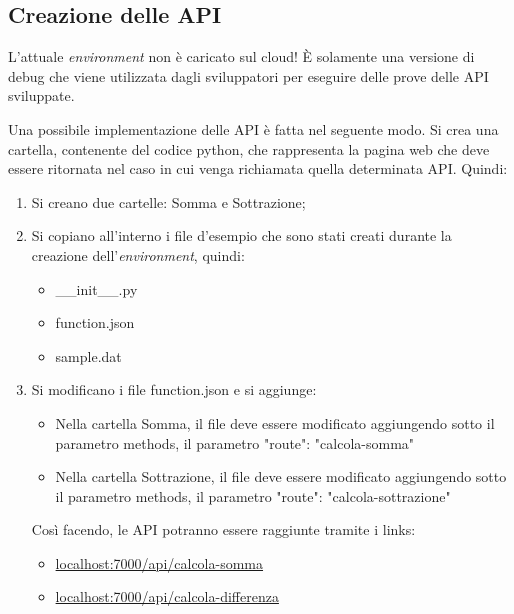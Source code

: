 \documentclass[a4paper]{article}
\begin{document}
	\subsection{Creazione delle API}
	
	L'attuale \emph{environment} non è caricato sul cloud! È solamente una versione di debug che viene utilizzata dagli sviluppatori per eseguire delle prove delle API sviluppate.\newline
	
	\noindent
	Una possibile implementazione delle API è fatta nel seguente modo. Si crea una cartella, contenente del codice python, che rappresenta la pagina web che deve essere ritornata nel caso in cui venga richiamata quella determinata API. Quindi:
	\begin{enumerate}
		\item Si creano due cartelle: Somma e Sottrazione;
		
		\item Si copiano all'interno i file d'esempio che sono stati creati durante la creazione dell'\emph{environment}, quindi:
		\begin{itemize}
			\item \textsf{\_\_init\_\_.py}
			
			\item \textsf{function.json}
			
			\item \textsf{sample.dat}
		\end{itemize}
		
		\item Si modificano i file \textsf{function.json} e si aggiunge:
		\begin{itemize}
			\item Nella cartella Somma, il file deve essere modificato aggiungendo sotto il parametro \textsf{methods}, il parametro \textsf{"route": "calcola-somma"}
			\item Nella cartella Sottrazione, il file deve essere modificato aggiungendo sotto il parametro \textsf{methods}, il parametro \textsf{"route": "calcola-sottrazione"}
		\end{itemize}
		Così facendo, le API potranno essere raggiunte tramite i links:
		\begin{itemize}
			\item \url{localhost:7000/api/calcola-somma}
			\item \url{localhost:7000/api/calcola-differenza}
		\end{itemize}
		

\end{enumerate}
\end{document}
